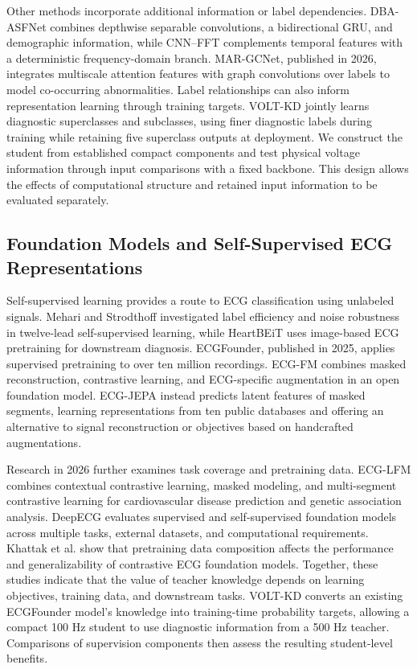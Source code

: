 \documentclass[11pt,a4paper]{article}
\begin{document}
Other methods incorporate additional information or label dependencies. DBA-ASFNet combines depthwise separable convolutions, a bidirectional GRU, and demographic information\cite{luo2025}, while CNN--FFT complements temporal features with a deterministic frequency-domain branch\cite{malik2026}. MAR-GCNet, published in 2026, integrates multiscale attention features with graph convolutions over labels to model co-occurring abnormalities\cite{luomar2026}. Label relationships can also inform representation learning through training targets. VOLT-KD jointly learns diagnostic superclasses and subclasses, using finer diagnostic labels during training while retaining five superclass outputs at deployment. We construct the student from established compact components and test physical voltage information through input comparisons with a fixed backbone. This design allows the effects of computational structure and retained input information to be evaluated separately.

\subsection{Foundation Models and Self-Supervised ECG Representations}
Self-supervised learning provides a route to ECG classification using unlabeled signals. Mehari and Strodthoff investigated label efficiency and noise robustness in twelve-lead self-supervised learning\cite{mehari2022}, while HeartBEiT uses image-based ECG pretraining for downstream diagnosis\cite{vaid2023}. ECGFounder, published in 2025, applies supervised pretraining to over ten million recordings\cite{li2025}. ECG-FM combines masked reconstruction, contrastive learning, and ECG-specific augmentation in an open foundation model\cite{mckeen2025}. ECG-JEPA instead predicts latent features of masked segments, learning representations from ten public databases and offering an alternative to signal reconstruction or objectives based on handcrafted augmentations\cite{weimann2025}.

Research in 2026 further examines task coverage and pretraining data. ECG-LFM combines contextual contrastive learning, masked modeling, and multi-segment contrastive learning for cardiovascular disease prediction and genetic association analysis\cite{lin2026}. DeepECG evaluates supervised and self-supervised foundation models across multiple tasks, external datasets, and computational requirements\cite{nolin2026}. Khattak et al. show that pretraining data composition affects the performance and generalizability of contrastive ECG foundation models\cite{khattak2026}. Together, these studies indicate that the value of teacher knowledge depends on learning objectives, training data, and downstream tasks. VOLT-KD converts an existing ECGFounder model's knowledge into training-time probability targets, allowing a compact 100 Hz student to use diagnostic information from a 500 Hz teacher. Comparisons of supervision components then assess the resulting student-level benefits.
\end{document}
